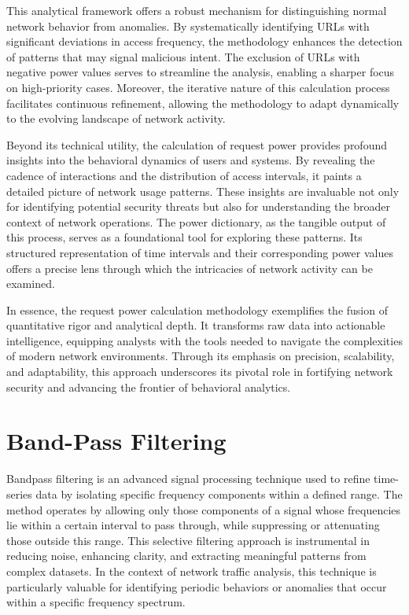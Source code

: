 This analytical framework offers a robust mechanism for distinguishing normal network behavior from anomalies. By systematically identifying URLs with significant deviations in access frequency, the methodology enhances the detection of patterns that may signal malicious intent. The exclusion of URLs with negative power values serves to streamline the analysis, enabling a sharper focus on high-priority cases. Moreover, the iterative nature of this calculation process facilitates continuous refinement, allowing the methodology to adapt dynamically to the evolving landscape of network activity.

Beyond its technical utility, the calculation of request power provides profound insights into the behavioral dynamics of users and systems. By revealing the cadence of interactions and the distribution of access intervals, it paints a detailed picture of network usage patterns. These insights are invaluable not only for identifying potential security threats but also for understanding the broader context of network operations. The power dictionary, as the tangible output of this process, serves as a foundational tool for exploring these patterns. Its structured representation of time intervals and their corresponding power values offers a precise lens through which the intricacies of network activity can be examined.

In essence, the request power calculation methodology exemplifies the fusion of quantitative rigor and analytical depth. It transforms raw data into actionable intelligence, equipping analysts with the tools needed to navigate the complexities of modern network environments. Through its emphasis on precision, scalability, and adaptability, this approach underscores its pivotal role in fortifying network security and advancing the frontier of behavioral analytics.

\section{Band-Pass Filtering}

Bandpass filtering is an advanced signal processing technique used to refine time-series data by isolating specific frequency components within a defined range. The method operates by allowing only those components of a signal whose frequencies lie within a certain interval to pass through, while suppressing or attenuating those outside this range. This selective filtering approach is instrumental in reducing noise, enhancing clarity, and extracting meaningful patterns from complex datasets. In the context of network traffic analysis, this technique is particularly valuable for identifying periodic behaviors or anomalies that occur within a specific frequency spectrum.

